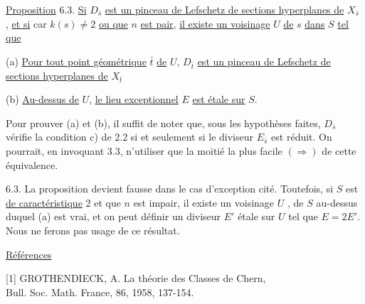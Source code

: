 \underline{Proposition} 6.3. \underline{Si} $D_{\bar{s}}$ \underline{est un pinceau de Lefschetz de sections hyperplanes de} $X_{\bar{s}}$ , \underline{et si} car $k(s) \neq 2$ \underline{ou que} $n$ \underline{est pair}, \underline{il existe un voisinage} $U$ \underline{de} $s$ \underline{dans} $S$ \underline{tel que}

(a) \underline{Pour tout point géométrique} $\bar{t}$ \underline{de} $U$, $D_{\bar{t}}$ \underline{est un pinceau de Lefschetz de sections hyperplanes de} $X_{\bar{t}}$

(b) \underline{Au-dessus de} $U$, \underline{le lieu exceptionnel} $E$ \underline{est étale sur} $S$.

Pour prouver (a) et (b), il suffit de noter que, sous les hypothèses faites, $D_{\bar{s}}$ vérifie la condition c) de 2.2 si et seulement si le diviseur $E_{\bar{s}}$ est réduit. On pourrait, en invoquant 3.3, n'utiliser que la moitié la plus facile $(\Longrightarrow)$ de cette équivalence.

6.3. La proposition devient fausse dans le cas d'exception cité. Toutefois, si $S$ est \underline{de caractéristique} 2 et que $n$ est impair, il existe un voisinage $U$ , de $S$ au-dessus duquel (a) est vrai, et on peut définir un diviseur $E'$ étale sur $U$ tel que $E = 2 E'$. Nous ne ferons pas usage de ce résultat.


\underline{Références}

[1] GROTHENDIECK, A. \quad La théorie des Classes de Chern, \\ \hspace*{5.5em} Bull. Soc. Math. France, 86, 1958, 137-154.
